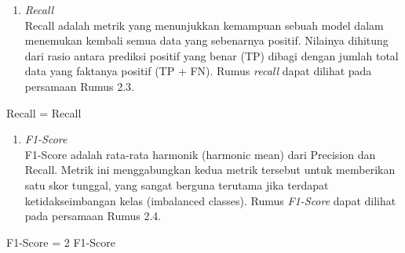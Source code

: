 
\begin{enumerate}
	\item \textit{Recall} \\
	Recall adalah metrik yang menunjukkan kemampuan sebuah model dalam 
    menemukan kembali semua data yang sebenarnya positif. Nilainya 
    dihitung dari rasio antara prediksi positif yang benar (TP) dibagi 
    dengan jumlah total data yang faktanya positif (TP + FN). Rumus 
    \textit{recall} dapat dilihat pada persamaan Rumus 2.3.
\end{enumerate}
\begin{equationcaptioned}[eq:2.recall]{
	Recall = 
}{
	Recall %
}
\end{equationcaptioned}


\begin{enumerate}
	\item \textit{F1-Score} \\
	F1-Score adalah rata-rata harmonik (harmonic mean) dari Precision dan 
    Recall. Metrik ini menggabungkan kedua metrik tersebut untuk memberikan 
    satu skor tunggal, yang sangat berguna terutama jika terdapat 
    ketidakseimbangan kelas (imbalanced classes). Rumus \textit{F1-Score} 
    dapat dilihat pada persamaan Rumus 2.4.
\end{enumerate}
\begin{equationcaptioned}[eq:2.f1score]{
	F1-Score = 2 \times {}
}{
	F1-Score %
}
\end{equationcaptioned}


